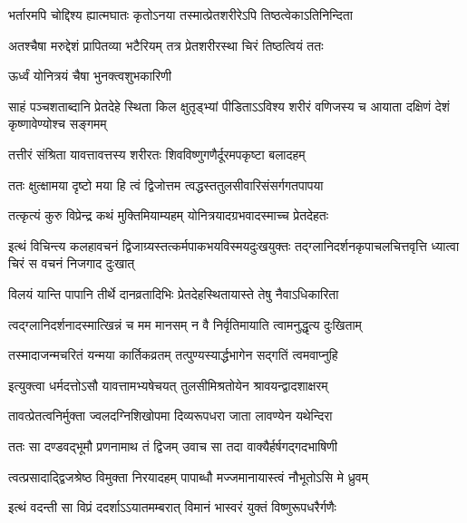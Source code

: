 \twolineshloka
{भर्तारमपि चोद्दिश्य ह्यात्मघातः कृतोऽनया}
{तस्मात्प्रेतशरीरेऽपि तिष्ठत्वेकाऽतिनिन्दिता} %

\twolineshloka
{अतश्चैषा मरुद्देशं प्रापितव्या भटैरियम्}
{तत्र प्रेतशरीरस्था चिरं तिष्ठत्वियं ततः} %


\onelineshloka
{ऊर्ध्वं योनित्रयं चैषा भुनक्त्वशुभकारिणी} %


\threelineshloka
{साहं पञ्चशताब्दानि प्रेतदेहे स्थिता किल}
{क्षुतृड्भ्यां पीडिताऽऽविश्य शरीरं वणिजस्य च}
{आयाता दक्षिणं देशं कृष्णावेण्योश्च सङ्गमम्} %

\twolineshloka
{तत्तीरं संश्रिता यावत्तावत्तस्य शरीरतः}
{शिवविष्णुगणैर्दूरमपकृष्टा बलादहम्} %

\twolineshloka
{ततः क्षुत्क्षामया दृष्टो मया हि त्वं द्विजोत्तम}
{त्वद्धस्ततुलसीवारिसंसर्गगतपापया} %

\twolineshloka
{तत्कृत्यं कुरु विप्रेन्द्र कथं मुक्तिमियाम्यहम्}
{योनित्रयादग्रभवादस्माच्च प्रेतदेहतः} %

\twolineshloka
{इत्थं विचिन्त्य कलहावचनं द्विजाग्र्यस्तत्कर्मपाकभयविस्मयदुःखयुक्तः}
{तद्ग्लानिदर्शनकृपाचलचित्तवृत्ति ध्यात्वा चिरं स वचनं निजगाद दुःखात्} %





\twolineshloka
{विलयं यान्ति पापानि तीर्थे दानव्रतादिभिः}
{प्रेतदेहस्थितायास्ते तेषु नैवाऽधिकारिता} %

\twolineshloka
{त्वद्ग्लानिदर्शनादस्मात्खिन्नं च मम मानसम्}
{न वै निर्वृतिमायाति त्वामनुद्धृत्य दुःखिताम्} %

\twolineshloka
{तस्मादाजन्मचरितं यन्मया कार्तिकव्रतम्}
{तत्पुण्यस्यार्द्धभागेन सद्गतिं त्वमवाप्नुहि} %


\twolineshloka
{इत्युक्त्वा धर्मदत्तोऽसौ यावत्तामभ्यषेचयत्}
{तुलसीमिश्रतोयेन श्रावयन्द्वादशाक्षरम्} %

\twolineshloka
{तावत्प्रेतत्वनिर्मुक्ता ज्वलदग्निशिखोपमा}
{दिव्यरूपधरा जाता लावण्येन यथेन्दिरा} %

\twolineshloka
{ततः सा दण्डवद्भूमौ प्रणनामाथ तं द्विजम्}
{उवाच सा तदा वाक्यैर्हर्षगद्गदभाषिणी} %


\twolineshloka
{त्वत्प्रसादाद्द्विजश्रेष्ठ विमुक्ता निरयादहम्}
{पापाब्धौ मज्जमानायास्त्वं नौभूतोऽसि मे ध्रुवम्} %


\twolineshloka
{इत्थं वदन्ती सा विप्रं ददर्शाऽऽयातमम्बरात्}
{विमानं भास्वरं युक्तं विष्णुरूपधरैर्गणैः} %

